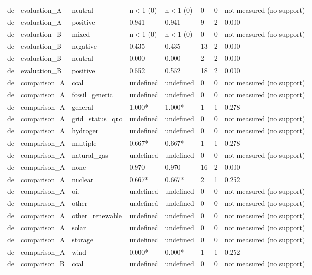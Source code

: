 \begin{table}[htbp]
\begin{tabular}{llllllll}
de & evaluation\_A & neutral & n$<$1 (0) & n$<$1 (0) & 0 & 0 & not measured (no support) \\
de & evaluation\_A & positive & 0.941 & 0.941 & 9 & 2 & 0.000 \\
de & evaluation\_B & mixed & n$<$1 (0) & n$<$1 (0) & 0 & 0 & not measured (no support) \\
de & evaluation\_B & negative & 0.435 & 0.435 & 13 & 2 & 0.000 \\
de & evaluation\_B & neutral & 0.000 & 0.000 & 2 & 2 & 0.000 \\
de & evaluation\_B & positive & 0.552 & 0.552 & 18 & 2 & 0.000 \\
de & comparison\_A & coal & undefined & undefined & 0 & 0 & not measured (no support) \\
de & comparison\_A & fossil\_generic & undefined & undefined & 0 & 0 & not measured (no support) \\
de & comparison\_A & general & 1.000* & 1.000* & 1 & 1 & 0.278 \\
de & comparison\_A & grid\_status\_quo & undefined & undefined & 0 & 0 & not measured (no support) \\
de & comparison\_A & hydrogen & undefined & undefined & 0 & 0 & not measured (no support) \\
de & comparison\_A & multiple & 0.667* & 0.667* & 1 & 1 & 0.278 \\
de & comparison\_A & natural\_gas & undefined & undefined & 0 & 0 & not measured (no support) \\
de & comparison\_A & none & 0.970 & 0.970 & 16 & 2 & 0.000 \\
de & comparison\_A & nuclear & 0.667* & 0.667* & 2 & 1 & 0.252 \\
de & comparison\_A & oil & undefined & undefined & 0 & 0 & not measured (no support) \\
de & comparison\_A & other & undefined & undefined & 0 & 0 & not measured (no support) \\
de & comparison\_A & other\_renewable & undefined & undefined & 0 & 0 & not measured (no support) \\
de & comparison\_A & solar & undefined & undefined & 0 & 0 & not measured (no support) \\
de & comparison\_A & storage & undefined & undefined & 0 & 0 & not measured (no support) \\
de & comparison\_A & wind & 0.000* & 0.000* & 1 & 1 & 0.252 \\
de & comparison\_B & coal & undefined & undefined & 0 & 0 & not measured (no support) \\

\end{tabular}
\end{table}
